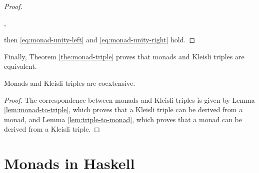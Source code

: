 \begin{lemma}
\begin{proof}
\begin{steps}
        \eqby{\eqref{eq:triple-unity-right}}
      ,
    \end{steps}
    then \eqref{eq:monad-unity-left} and \eqref{eq:monad-unity-right}
    hold.

  \end{proof}

\end{lemma}

Finally, Theorem \ref{the:monad-triple} proves that monads and Kleisli triples
are equivalent.

\begin{theorem}
  \label{the:monad-triple}

  Monads and Kleisli triples are coextensive.

  \begin{proof}

    The correspondence between monads and Kleisli triples is given by Lemma
    \ref{lem:monad-to-triple}, which proves that a Kleisli triple can be
    derived from a monad, and Lemma \ref{lem:triple-to-monad}, which proves
    that a monad can be derived from a Kleisli triple.

  \end{proof}

\end{theorem}


\begin{example}
  \label{ex:monad-triple-identity}

\end{example}


\section{Monads in Haskell}
\label{sec:monads-haskell}

